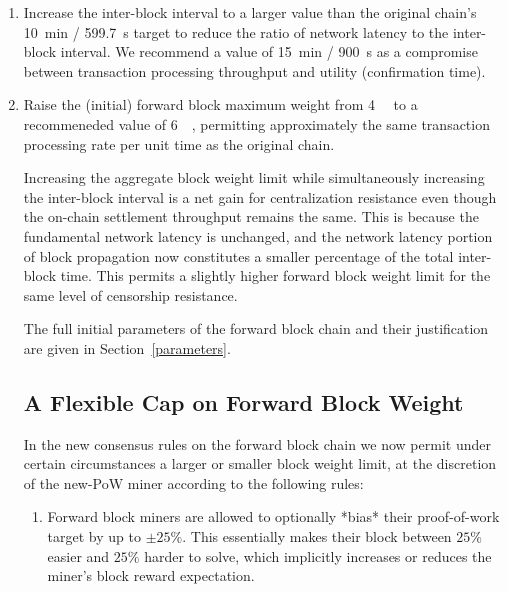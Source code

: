 \begin{enumerate}

  \item

    Increase the inter-block interval to a larger value than the
    original chain's \SI{10}{\minute} / \SI{599.7}{\second} target to
    reduce the ratio of network latency to the inter-block interval.
    We recommend a value of \SI{15}{\minute} / \SI{900}{\second} as a
    compromise between transaction processing throughput and utility
    (confirmation time).

  \item

    Raise the (initial) forward block maximum weight
    from \SI{4}{\mega\weight} to a recommeneded value
    of \SI{6}{\mega\weight}, permitting approximately the same
    transaction processing rate per unit time as the original chain.


Increasing the aggregate block weight limit while simultaneously
increasing the inter-block interval is a net gain for centralization
resistance even though the on-chain settlement throughput remains the
same.  This is because the fundamental network latency is unchanged,
and the network latency portion of block propagation now constitutes a
smaller percentage of the total inter-block time.  This permits a
slightly higher forward block weight limit for the same level of
censorship resistance.

The full initial parameters of the forward block chain and their
justification are given in Section~\ref{parameters}.

\subsection{A Flexible Cap on Forward Block Weight}

In the new consensus rules on the forward block chain we now permit
under certain circumstances a larger or smaller block weight limit, at
the discretion of the new-PoW miner according to the following rules:

\begin{enumerate}

  \item

    Forward block miners are allowed to optionally *bias* their
    proof-of-work target by up to $\pm 25\%$.  This essentially makes
    their block between $25\%$ easier and $25\%$ harder to solve,
    which implicitly increases or reduces the miner's block reward
    expectation.


\end{enumerate}
\end{enumerate}
